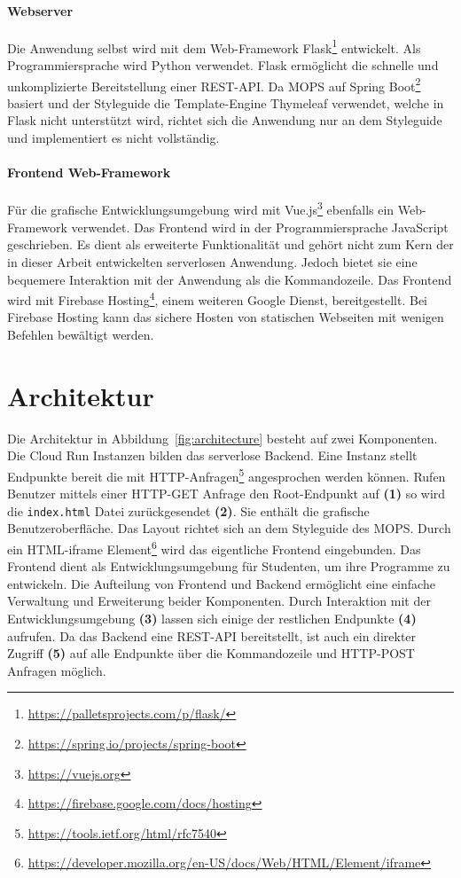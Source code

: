 \paragraph{Webserver} Die Anwendung selbst wird mit dem Web-Framework
Flask\footnote{\url{https://palletsprojects.com/p/flask/}}
entwickelt. Als Programmiersprache wird Python verwendet.
Flask ermöglicht die schnelle und unkomplizierte Bereitstellung einer REST-API.
Da MOPS auf Spring Boot\footnote{\url{https://spring.io/projects/spring-boot}} basiert und
der Styleguide die Template-Engine Thymeleaf verwendet, welche in Flask nicht unterstützt wird,
richtet sich die Anwendung nur an dem Styleguide und implementiert es nicht vollständig.

\paragraph{Frontend Web-Framework} Für die grafische Entwicklungsumgebung
wird mit Vue.js\footnote{\url{https://vuejs.org}} ebenfalls ein Web-Framework verwendet.
Das Frontend wird in der Programmiersprache JavaScript geschrieben. Es dient als
erweiterte Funktionalität und gehört nicht zum Kern der in dieser Arbeit entwickelten
serverlosen Anwendung. Jedoch bietet sie eine bequemere Interaktion mit der Anwendung als
die Kommandozeile. Das Frontend wird mit
Firebase Hosting\footnote{\url{https://firebase.google.com/docs/hosting}}, einem weiteren Google Dienst,
bereitgestellt. Bei Firebase Hosting kann das sichere Hosten von statischen Webseiten
mit wenigen Befehlen bewältigt werden.

\section{Architektur}
Die Architektur in Abbildung~\ref{fig:architecture} besteht auf zwei
Komponenten.
Die Cloud Run Instanzen bilden das serverlose Backend.
Eine Instanz stellt Endpunkte bereit die mit HTTP-Anfragen\footnote{\url{https://tools.ietf.org/html/rfc7540}}
angesprochen werden
können. Rufen Benutzer mittels einer HTTP-GET Anfrage den
Root-Endpunkt auf \textbf{(1)} so wird
die \texttt{index.html} Datei zurückgesendet \textbf{(2)}.
Sie enthält die grafische Benutzeroberfläche. Das Layout richtet
sich an dem Styleguide des MOPS. Durch ein
HTML-iframe Element\footnote{\url{https://developer.mozilla.org/en-US/docs/Web/HTML/Element/iframe}}
wird das eigentliche Frontend eingebunden. Das Frontend dient als Entwicklungsumgebung für
Studenten, um ihre Programme zu entwickeln. Die Aufteilung von Frontend und Backend
ermöglicht eine einfache Verwaltung und Erweiterung beider Komponenten.
Durch Interaktion mit der Entwicklungsumgebung \textbf{(3)} lassen sich einige
der restlichen Endpunkte \textbf{(4)} aufrufen. 
Da das Backend eine REST-API bereitstellt, ist auch ein direkter Zugriff \textbf{(5)} auf alle 
Endpunkte über die Kommandozeile und HTTP-POST Anfragen möglich.

